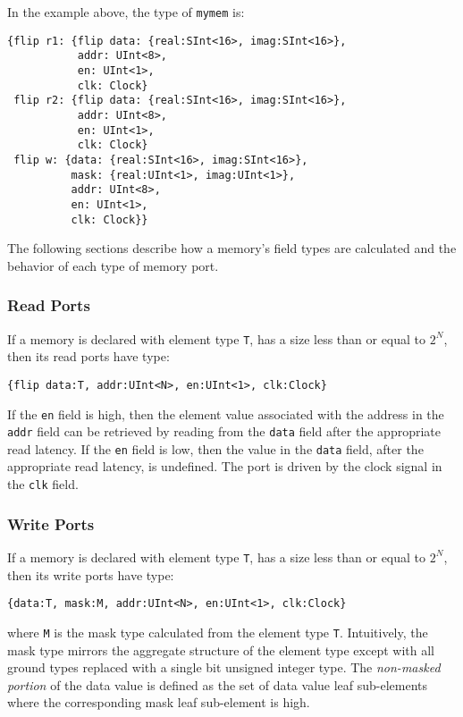 \documentclass[12pt]{article}
\begin{document}
In the example above, the type of \verb|mymem| is:
\begin{lstlisting}
{flip r1: {flip data: {real:SInt<16>, imag:SInt<16>},
           addr: UInt<8>,
           en: UInt<1>,
           clk: Clock}
 flip r2: {flip data: {real:SInt<16>, imag:SInt<16>},
           addr: UInt<8>,
           en: UInt<1>,
           clk: Clock}
 flip w: {data: {real:SInt<16>, imag:SInt<16>},
          mask: {real:UInt<1>, imag:UInt<1>},
          addr: UInt<8>,
          en: UInt<1>,
          clk: Clock}}
\end{lstlisting}

The following sections describe how a memory's field types are calculated and the behavior of each type of memory port.

\subsubsection{Read Ports}
If a memory is declared with element type \verb|T|, has a size less than or equal to $2^N$, then its read ports have type:
\begin{lstlisting}
{flip data:T, addr:UInt<N>, en:UInt<1>, clk:Clock}
\end{lstlisting}

If the \verb|en| field is high, then the element value associated with the address in the \verb|addr| field can be retrieved by reading from the \verb|data| field after the appropriate read latency. If the \verb|en| field is low, then the value in the \verb|data| field, after the appropriate read latency, is undefined. The port is driven by the clock signal in the \verb|clk| field.

\subsubsection{Write Ports}
If a memory is declared with element type \verb|T|, has a size less than or equal to $2^N$, then its write ports have type:
\begin{lstlisting}
{data:T, mask:M, addr:UInt<N>, en:UInt<1>, clk:Clock}
\end{lstlisting}
where \verb|M| is the mask type calculated from the element type \verb|T|. Intuitively, the mask type mirrors the aggregate structure of the element type except with all ground types replaced with a single bit unsigned integer type. The {\em non-masked portion} of the data value is defined as the set of data value leaf sub-elements where the corresponding mask leaf sub-element is high.
\end{document}
